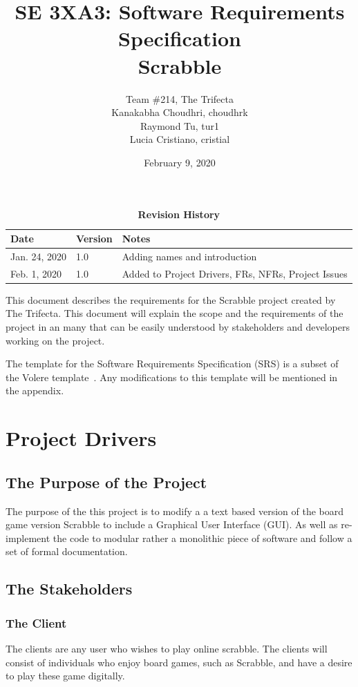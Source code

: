 \documentclass[12pt, titlepage]{article}
\title{SE 3XA3: Software Requirements Specification\\Scrabble}
\author{Team \#214, The Trifecta
		\\Kanakabha Choudhri, choudhrk
		\\ Raymond Tu, tur1
		\\ Lucia Cristiano, cristial
}
\date{February 9, 2020}
\begin{document}
\maketitle

\tableofcontents
\listoftables
\listoffigures

\begin{table}[bp]
\caption{\bf Revision History}
\begin{tabularx}{\textwidth}{p{3cm}p{2cm}X}
\toprule {\bf Date} & {\bf Version} & {\bf Notes}\\
\midrule
Jan. 24, 2020 & 1.0 & Adding names and introduction\\
Feb. 1, 2020 & 1.0 & Added to Project Drivers, FRs, NFRs, Project Issues\\
\bottomrule
\end{tabularx}
\end{table}

\newpage

This document describes the requirements for the Scrabble project created by The Trifecta. This document will explain the scope and the requirements of the project in an many that can be easily understood by stakeholders and developers working on the project.

The template for the Software Requirements Specification (SRS) is a subset of the Volere template~\cite{robertson_robertson}. Any modifications to this template will be mentioned in the appendix.
\section{Project Drivers}

\subsection{The Purpose of the Project}
The purpose of the this project is to modify a a text based version of the board game version Scrabble to include a Graphical User Interface (GUI). As well as re-implement the code to modular rather a monolithic piece of software and follow a set of formal documentation. 
\subsection{The Stakeholders}
\subsubsection{The Client}
    The clients are any user who wishes to play online scrabble. The clients will consist of individuals who enjoy board games, such as Scrabble, and have a desire to play these game digitally. 
\end{document}
